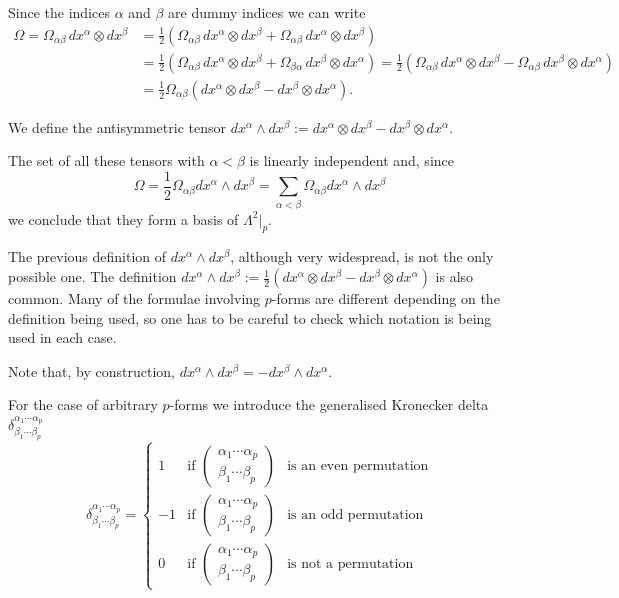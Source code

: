 \begin{points}
\item Since the indices $\alpha$ and $\beta$ are dummy indices we can write
\begin{align*}
  \Omega=\Omega_{\alpha\beta}\,dx^\alpha\otimes dx^\beta&=\frac12\left(\Omega_{\alpha\beta}\,dx^\alpha\otimes dx^\beta+\Omega_{\alpha\beta}\,dx^\alpha\otimes dx^\beta\right)\\
  &=\frac12\left(\Omega_{\alpha\beta}\,dx^\alpha\otimes dx^\beta+\Omega_{\beta\alpha}\,dx^\beta\otimes dx^\alpha\right)=\frac12\left(\Omega_{\alpha\beta}\,dx^\alpha\otimes dx^\beta-\Omega_{\alpha\beta}\,dx^\beta\otimes dx^\alpha\right)\\
  &=\frac12\Omega_{\alpha\beta}\left(dx^\alpha\otimes dx^\beta-dx^\beta\otimes dx^\alpha\right).
\end{align*}

\item We define the antisymmetric tensor $dx^\alpha\wedge dx^\beta:=dx^\alpha\otimes dx^\beta-dx^\beta\otimes dx^\alpha$.

\item The set of all these tensors with $\alpha<\beta$ is linearly independent and, since
\[
  \Omega=\frac12\Omega_{\alpha\beta}dx^\alpha\wedge dx^\beta=\sum_{\alpha<\beta}\Omega_{\alpha\beta}dx^\alpha\wedge dx^\beta
\]
we conclude that they form a basis of $\Lambda^2|_p$.

\item The previous definition of $dx^\alpha\wedge dx^\beta$, although very widespread, is not the only possible one. The definition $dx^\alpha\wedge dx^\beta:=\frac12(dx^\alpha\otimes dx^\beta-dx^\beta\otimes dx^\alpha)$ is also common. Many of the formulae involving $p$-forms are different depending on the definition being used, so one has to be careful to check which notation is being used in each case.

\item Note that, by construction, $dx^\alpha\wedge dx^\beta=-dx^\beta\wedge dx^\alpha$.

\item For the case of arbitrary $p$-forms we introduce the generalised Kronecker delta $\delta^{\alpha_1\cdots\alpha_p}_{\beta_1\cdots\beta_p}$
\[
  \delta^{\alpha_1\cdots\alpha_p}_{\beta_1\cdots\beta_p}=\left\{\begin{array}{lll}
  1&\text{if }\begin{pmatrix}\alpha_1\cdots\alpha_p\\ \beta_1\cdots\beta_p\end{pmatrix}&\text{is an even permutation}\\[3ex]
  -1&\text{if }\begin{pmatrix}\alpha_1\cdots\alpha_p\\ \beta_1\cdots\beta_p\end{pmatrix}&\text{is an odd permutation}\\[3ex]
  0&\text{if }\begin{pmatrix}\alpha_1\cdots\alpha_p\\ \beta_1\cdots\beta_p\end{pmatrix}&\text{is not a permutation}
  \end{array}\right.
\]


\end{points}
